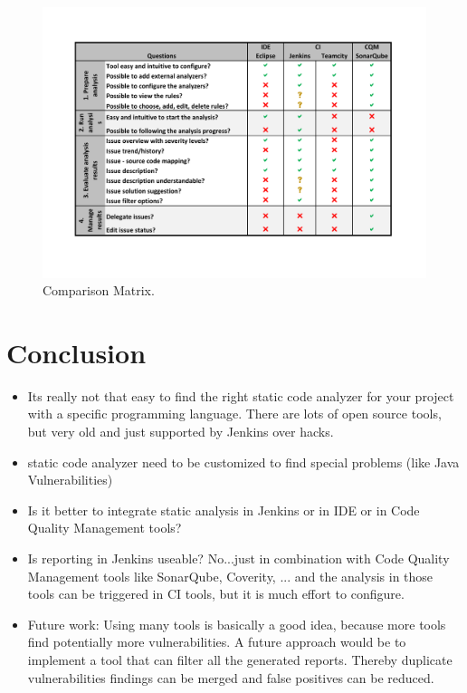 \documentclass[conference]{IEEEtran}
\begin{document}
\begin{figure}[t]
	\includegraphics[width=\textwidth]{img/comparation}
	\caption{Comparison Matrix.}
	\label{fig:comparison_matrix}
\end{figure}



\section{Conclusion}
\label{sec:conclusion}
\begin{itemize}
	\item Its really not that easy to find the right static code analyzer for your project with a specific programming language. There are lots of open source tools, but very old and just supported by Jenkins over hacks.
	\item static code analyzer need to be customized to find special problems (like Java Vulnerabilities)
	\item Is it better to integrate static analysis in Jenkins or in IDE or in Code Quality Management tools?
	\item Is reporting in Jenkins useable? No...just in combination with Code Quality Management tools like SonarQube, Coverity, ... and the analysis in those tools can be triggered in CI tools, but it is much effort to configure.
	\item Future work: Using many tools is basically a good idea, because more tools find potentially more vulnerabilities. A future approach would be to implement a tool that can filter all the generated reports. Thereby duplicate vulnerabilities findings can be merged and false positives can be reduced.
\end{itemize}





\end{document}
